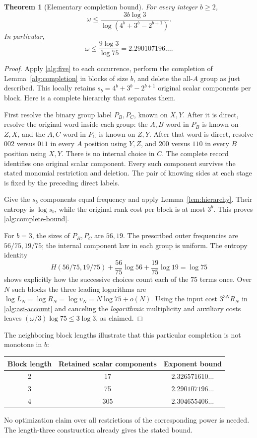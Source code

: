 \documentclass[11pt]{article}
\numberwithin{equation}{section}
\newtheorem{theorem}{Theorem}[section]
\theoremstyle{definition}
\theoremstyle{remark}
\begin{document}
\begin{theorem}[Elementary completion bound]
\label{thm:elementary}
For every integer \(b\geq2\),
\begin{equation}
 \omega\leq
 \frac{3b\log3}{\log(4^b+3^b-2^{b+1})}.
 \label{alg:complete-bound}
\end{equation}
In particular,
\[
 \omega\leq\frac{9\log3}{\log75}=2.290107196\ldots.
\]
\end{theorem}
\begin{proof}
Apply \eqref{alg:five} to each occurrence, perform the completion of
Lemma~\ref{alg:completion} in blocks of size \(b\), and delete the
all-\(A\) group as just described.  This locally retains
\(s_b=4^b+3^b-2^{b+1}\) original scalar components per block.
Here is a complete hierarchy that separates them.

First resolve the binary group label \(P_B,P_C\), known on \(X,Y\).
After it is direct, resolve the original word inside each group: the
\(A,B\) word in \(P_B\) is known on \(Z,X\), and the \(A,C\) word
in \(P_C\) is known on \(Z,Y\).  After that word is direct, resolve
\(002\) versus \(011\) in every \(A\) position using \(Y,Z\), and
\(200\) versus \(110\) in every \(B\) position using \(X,Y\).
There is no internal choice in \(C\).  The complete record identifies
one original scalar component.  Every such component survives the stated
monomial restriction and deletion.  The pair of knowing sides at each
stage is fixed by the preceding direct labels.

Give the \(s_b\) components equal frequency and apply
Lemma~\ref{lem:hierarchy}.  Their entropy is \(\log s_b\), while the
original rank cost per block is at most \(3^b\).  This proves
\eqref{alg:complete-bound}.

For \(b=3\), the sizes of \(P_B,P_C\) are \(56,19\).  The prescribed
outer frequencies are \(56/75,19/75\); the internal component law in
each group is uniform.  The entropy identity
\[
 H(56/75,19/75)+\frac{56}{75}\log56+\frac{19}{75}\log19=\log75
\]
shows explicitly how the successive choices count each of the 75 terms
once.  Over \(N\) such blocks the three leading logarithms are
\(\log L_N=\log R_N=\log v_N=N\log75+o(N)\).
Using the input cost \(3^{3N}R_N\) in
\eqref{alg:asi-account} and canceling the \emph{logarithmic} multiplicity
and auxiliary costs leaves
\((\omega/3)\log75\leq3\log3\), as claimed.
\end{proof}

The neighboring block lengths illustrate that this particular completion
is not monotone in \(b\):
\begin{center}
\begin{tabular}{@{}ccc@{}}
\toprule
Block length & Retained scalar components & Exponent bound \\
\midrule
2 & 17 & \(2.326571610\ldots\) \\
3 & 75 & \(2.290107196\ldots\) \\
4 & 305 & \(2.304655406\ldots\) \\
\bottomrule
\end{tabular}
\end{center}
No optimization claim over all restrictions of the corresponding power is
needed.  The length-three construction already gives the stated bound.
\end{document}

